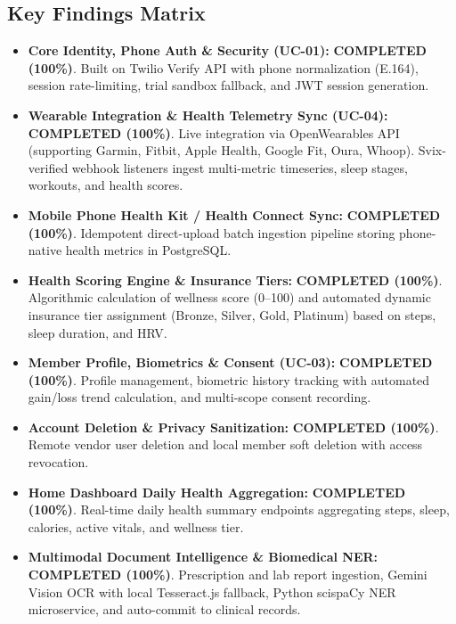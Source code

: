 \documentclass[11pt,a4paper]{article}
\begin{document}
\subsection{Key Findings Matrix}
\begin{itemize}[leftmargin=1.5em]
    \item \textbf{Core Identity, Phone Auth \& Security (UC-01):} \textcolor{statuscompleted}{\textbf{COMPLETED (100\%)}}. Built on Twilio Verify API with phone normalization (E.164), session rate-limiting, trial sandbox fallback, and JWT session generation.
    \item \textbf{Wearable Integration \& Health Telemetry Sync (UC-04):} \textcolor{statuscompleted}{\textbf{COMPLETED (100\%)}}. Live integration via OpenWearables API (supporting Garmin, Fitbit, Apple Health, Google Fit, Oura, Whoop). Svix-verified webhook listeners ingest multi-metric timeseries, sleep stages, workouts, and health scores.
    \item \textbf{Mobile Phone Health Kit / Health Connect Sync:} \textcolor{statuscompleted}{\textbf{COMPLETED (100\%)}}. Idempotent direct-upload batch ingestion pipeline storing phone-native health metrics in PostgreSQL.
    \item \textbf{Health Scoring Engine \& Insurance Tiers:} \textcolor{statuscompleted}{\textbf{COMPLETED (100\%)}}. Algorithmic calculation of wellness score (0--100) and automated dynamic insurance tier assignment (Bronze, Silver, Gold, Platinum) based on steps, sleep duration, and HRV.
    \item \textbf{Member Profile, Biometrics \& Consent (UC-03):} \textcolor{statuscompleted}{\textbf{COMPLETED (100\%)}}. Profile management, biometric history tracking with automated gain/loss trend calculation, and multi-scope consent recording.
    \item \textbf{Account Deletion \& Privacy Sanitization:} \textcolor{statuscompleted}{\textbf{COMPLETED (100\%)}}. Remote vendor user deletion and local member soft deletion with access revocation.
    \item \textbf{Home Dashboard Daily Health Aggregation:} \textcolor{statuscompleted}{\textbf{COMPLETED (100\%)}}. Real-time daily health summary endpoints aggregating steps, sleep, calories, active vitals, and wellness tier.
    \item \textbf{Multimodal Document Intelligence \& Biomedical NER:} \textcolor{statuscompleted}{\textbf{COMPLETED (100\%)}}. Prescription and lab report ingestion, Gemini Vision OCR with local Tesseract.js fallback, Python scispaCy NER microservice, and auto-commit to clinical records.

\end{itemize}
\end{document}
